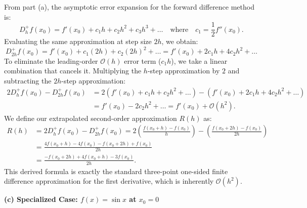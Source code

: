 \begin{solution}
From part (a), the asymptotic error expansion for the forward difference method is:
\[
    D_h^+ f(x_0) = f'(x_0) + c_1 h + c_2 h^2 + c_3 h^3 + \dots \quad \text{where} \quad c_1 = \frac{1}{2} f''(x_0).
\]
Evaluating the same approximation at step size $2h$, we obtain:
\[
    D_{2h}^+ f(x_0) = f'(x_0) + c_1 (2h) + c_2 (2h)^2 + \dots = f'(x_0) + 2 c_1 h + 4 c_2 h^2 + \dots
\]
To eliminate the leading-order $\mathcal{O}(h)$ error term ($c_1 h$), we take a linear combination that cancels it. Multiplying the $h$-step approximation by $2$ and subtracting the $2h$-step approximation:
\begin{align*}
    2 D_h^+ f(x_0) - D_{2h}^+ f(x_0) &= 2 \left( f'(x_0) + c_1 h + c_2 h^2 + \dots \right) - \left( f'(x_0) + 2 c_1 h + 4 c_2 h^2 + \dots \right) \\
    &= f'(x_0) - 2 c_2 h^2 + \dots = f'(x_0) + \mathcal{O}(h^2).
\end{align*}
We define our extrapolated second-order approximation $R(h)$ as:
\begin{align*}
    R(h) &= 2 D_h^+ f(x_0) - D_{2h}^+ f(x_0) = 2 \left( \frac{f(x_0 + h) - f(x_0)}{h} \right) - \left( \frac{f(x_0 + 2h) - f(x_0)}{2h} \right) \\
    &= \frac{4 f(x_0 + h) - 4 f(x_0) - f(x_0 + 2h) + f(x_0)}{2h} \\
    &= \frac{-f(x_0 + 2h) + 4 f(x_0 + h) - 3 f(x_0)}{2h}.
\end{align*}
This derived formula is exactly the standard three-point one-sided finite difference approximation for the first derivative, which is inherently $\mathcal{O}(h^2)$.

\textbf{(c) Specialized Case: $f(x) = \sin x$ at $x_0 = 0$}


\end{solution}
